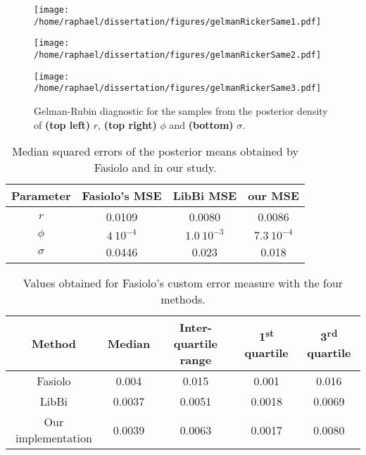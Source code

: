 \documentclass[12pt]{article}
\newcommand{\ra}[1]{\renewcommand{\arraystretch}{#1}}
\begin{document}
\clearpage
	\begin{figure}[htb]
		\centering
		\begin{minipage}{0.4\textwidth}
			\centering
			\texttt{[image: /home/raphael/dissertation/figures/gelmanRickerSame1.pdf]}
		\end{minipage}
		\begin{minipage}{0.4\textwidth}
			\centering
			\texttt{[image: /home/raphael/dissertation/figures/gelmanRickerSame2.pdf]}
		\end{minipage}
		\begin{minipage}{0.4\textwidth}
			\centering
			\texttt{[image: /home/raphael/dissertation/figures/gelmanRickerSame3.pdf]}
		\end{minipage}
		\caption{Gelman-Rubin diagnostic for the samples from the posterior density of \textbf{(top left)} $r$, \textbf{(top right)} $\phi$ and \textbf{(bottom)} $\sigma$.}
		\label{fig:gelmanDiag}
	\end{figure}
	
	\begin{table}[htb]
		\centering
		\ra{1.3}
		\begin{tabular}{@{}cccc@{}} \toprule
			Parameter & Fasiolo's MSE & LibBi MSE & our MSE\\ \midrule 
			$r$ & 0.0109 & 0.0080 &  0.0086 \\ 
			$\phi$ & $4 \ 10^{-4}$ & $1.0 \ 10^{-3}$ &  $7.3 \ 10^{-4}$ \\ 
			$\sigma$ & 0.0446 & 0.023 & 0.018  \\ \bottomrule
		\end{tabular}
		\caption{Median squared errors of the posterior means obtained by Fasiolo and in our study.}
		\label{table:mse}
	\end{table}

	\begin{table}[htb]
		\centering
		\ra{1.3}
		\begin{tabular}{@{}ccccc@{}} \toprule
			Method & Median &  Inter-quartile range & 1\textsuperscript{st} quartile & 3\textsuperscript{rd} quartile \\ \midrule 
			Fasiolo & 0.004 & 0.015 & 0.001 & 0.016\\ 
			LibBi & 0.0037 & 0.0051 &0.0018 & 0.0069 \\ 
			Our implementation & 0.0039 &  0.0063 & 0.0017 & 0.0080\\ \bottomrule
		\end{tabular}
		\caption{Values obtained for Fasiolo's custom error measure with the four methods.}
		\label{table:metric}
	\end{table}
	
\end{document}
